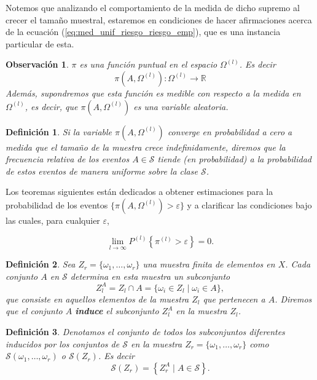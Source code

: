 \documentclass{report}
\newtheorem{dfn}{Definición}[section]
\newtheorem{obs}{Observación}[section]
\begin{document}
Notemos que analizando el comportamiento de la medida de dicho supremo al crecer el tamaño muestral,
estaremos en condiciones de hacer afirmaciones acerca de la ecuación (\ref{eq:med_unif_riesgo_riesgo_emp}),
que es una instancia particular de esta.

\begin{obs}
$\pi$ es una función puntual en el espacio \( \Omega^{(l)} \). Es decir
\[ \pi(A, \Omega^{(l)}): \Omega^{(l)} \rightarrow \mathbb{R}
\]
Además, supondremos que esta función es medible con respecto a la medida en \( \Omega^{(l)} \),
es decir, que \( \pi(A, \Omega^{(l)}) \) es una variable aleatoria.
\end{obs}
\begin{dfn}
Si la variable \( \pi(A, \Omega^{(l)}) \) converge en probabilidad a cero a medida que
el tamaño de la muestra crece indefinidamente, diremos que la frecuencia relativa
de los eventos \( A \in \mathcal{S} \) tiende (en probabilidad) a la probabilidad
de estos eventos de manera \emph{uniforme} sobre la clase \( \mathcal{S} \).
\end{dfn}


Los teoremas siguientes están dedicados a obtener estimaciones para la probabilidad
de los eventos \( \{ \pi(A, \Omega^{(l)}) > \varepsilon \} \) y a clarificar las condiciones
bajo las cuales, para cualquier \( \varepsilon \),

\[
\lim_{l \to \infty} P^{(l)}\left\{\pi^{(l)} > \varepsilon\right\} = 0.
\]
\bigskip


\begin{dfn}
Sea \( Z_r = \{\omega_1, \dots, \omega_r\} \) una muestra finita de elementos en \( X \).
Cada conjunto \( A \) en \( \mathcal{S} \) determina en esta muestra un subconjunto
\[
    Z_l^A = Z_l \cap A = \{\omega_i \in Z_l \mid \omega_i \in A\},
\]
que consiste en aquellos elementos de la
muestra \( Z_l \) que pertenecen a \( A \). Diremos que el conjunto \( A \) \textbf{induce}
el subconjunto \( Z_l^A  \) en la muestra \( Z_l \).
\end{dfn}
\bigskip

\begin{dfn}
Denotamos el conjunto de todos los subconjuntos diferentes inducidos por los
conjuntos de \( \mathcal{S} \) en la muestra \( Z_r = \{\omega_1, \dots, \omega_r\} \) como \( \mathcal{S}(\omega_1, \dots, \omega_r) \)
o \( \mathcal{S}(Z_r) \). Es decir
\[
    \mathcal{S}(Z_r) =  \left\{Z_r^A \mid A \in \mathcal{S}\right\}.
\]
\end{dfn}
\bigskip
\end{document}
